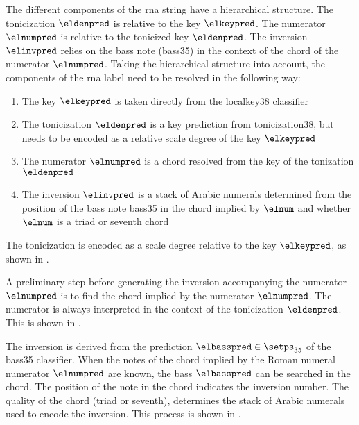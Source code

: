 
The different components of the \gls{rna} string have a
hierarchical structure. The tonicization $\eldenpred$ is
relative to the key $\elkeypred$. The numerator $\elnumpred$
is relative to the tonicized key $\eldenpred$. The inversion
$\elinvpred$ relies on the bass note (\gls{bass35}) in the
context of the chord of the numerator $\elnumpred$. Taking
the hierarchical structure into account, the components of
the \gls{rna} label need to be resolved in the following
way:

\begin{enumerate} 
    \item The key $\elkeypred$ is taken directly from the
    \gls{localkey38} classifier 
    \item The tonicization $\eldenpred$ is a key prediction
    from \gls{tonicization38}, but needs to be encoded as a
    relative scale degree of the key $\elkeypred$
    \item The numerator $\elnumpred$ is a chord resolved
    from the key of the tonization $\eldenpred$ 
    \item The inversion $\elinvpred$ is a stack of Arabic
    numerals determined from the position of the bass note
    \gls{bass35} in the chord implied by $\elnum$ and
    whether $\elnum$ is a triad or seventh chord
\end{enumerate}


The tonicization is encoded as a scale degree relative to
the key $\elkeypred$, as shown in
.



A preliminary step before generating the inversion
accompanying the numerator $\elnumpred$ is to find the chord
implied by the numerator $\elnumpred$. The numerator is
always interpreted in the context of the tonicization
$\eldenpred$. This is shown in
.



The inversion is derived from the prediction $\elbasspred
\in \setps_{35}$ of the \gls{bass35} classifier. When the
notes of the chord implied by the Roman numeral numerator
$\elnumpred$ are known, the bass $\elbasspred$ can be
searched in the chord. The position of the note in the chord
indicates the inversion number. The quality of the chord
(triad or seventh), determines the stack of Arabic numerals
used to encode the inversion. This process is shown in
.

